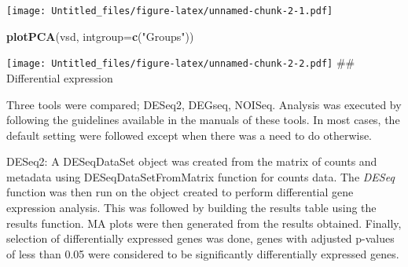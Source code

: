 \documentclass[]{article}
\newenvironment{Shaded}{\begin{snugshade}}{\end{snugshade}}
\newcommand{\DataTypeTok}[1]{\textcolor[rgb]{0.13,0.29,0.53}{#1}}
\newcommand{\DecValTok}[1]{\textcolor[rgb]{0.00,0.00,0.81}{#1}}
\newcommand{\KeywordTok}[1]{\textcolor[rgb]{0.13,0.29,0.53}{\textbf{#1}}}
\newcommand{\NormalTok}[1]{#1}
\newcommand{\OperatorTok}[1]{\textcolor[rgb]{0.81,0.36,0.00}{\textbf{#1}}}
\newcommand{\OtherTok}[1]{\textcolor[rgb]{0.56,0.35,0.01}{#1}}
\newcommand{\StringTok}[1]{\textcolor[rgb]{0.31,0.60,0.02}{#1}}
\begin{document}
\begin{Shaded}
\end{Shaded}

\texttt{[image: Untitled\_files/figure-latex/unnamed-chunk-2-1.pdf]}

\begin{Shaded}
\begin{Highlighting}[]
\KeywordTok{plotPCA}\NormalTok{(vsd, }\DataTypeTok{intgroup=}\KeywordTok{c}\NormalTok{(}\StringTok{"Groups"}\NormalTok{))}
\end{Highlighting}
\end{Shaded}

\texttt{[image: Untitled\_files/figure-latex/unnamed-chunk-2-2.pdf]} \#\#
Differential expression

Three tools were compared; DESeq2, DEGseq, NOISeq. Analysis was executed
by following the guidelines available in the manuals of these tools. In
most cases, the default setting were followed except when there was a
need to do otherwise.

DESeq2: A DESeqDataSet object was created from the matrix of counts and
metadata using DESeqDataSetFromMatrix function for counts data. The
\emph{\emph{DESeq}} function was then run on the object created to
perform differential gene expression analysis. This was followed by
building the results table using the results function. MA plots were
then generated from the results obtained. Finally, selection of
differentially expressed genes was done, genes with adjusted p-values of
less than 0.05 were considered to be significantly differentially
expressed genes.
\end{document}
